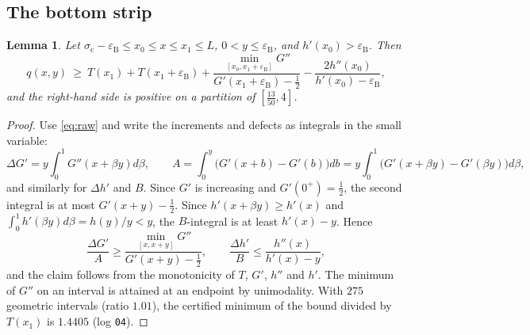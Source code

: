 \documentclass[11pt,a4paper]{article}
\newtheorem{lemma}[theorem]{Lemma}
\theoremstyle{definition}
\theoremstyle{remark}
\newcommand{\sig}{\sigma_{\mathrm c}}
\newcommand{\eB}{\varepsilon_{\mathrm B}}
\newcommand{\Lx}{L}
\begin{document}
\subsection{The bottom strip}
\begin{lemma}\label{lem:bottom}
Let $\sig-\eB\le x_0\le x\le x_1\le\Lx$, $0<y\le\eB$, and $h'(x_0)>\eB$. Then
\[
q(x,y)\ \ge\ T(x_1)+T(x_1+\eB)+\frac{\min_{[x_0,x_1+\eB]}G''}{G'(x_1+\eB)-\frac12}-\frac{2h''(x_0)}{h'(x_0)-\eB},
\]
and the right-hand side is positive on a partition of $[\frac{13}{50},4]$.
\end{lemma}
\begin{proof}
Use \eqref{eq:raw} and write the increments and defects as integrals in the small variable:
\[
\Delta G'=y\!\int_0^1\!G''(x+\beta y)d\beta,\qquad A=\int_0^y\bigl(G'(x+b)-G'(b)\bigr)db=y\!\int_0^1\!\bigl(G'(x+\beta y)-G'(\beta y)\bigr)d\beta,
\]
and similarly for $\Delta h'$ and $B$. Since $G'$ is increasing and $G'(0^+)=\frac12$, the second integral is at most $G'(x+y)-\frac12$. Since $h'(x+\beta y)\ge h'(x)$ and $\int_0^1h'(\beta y)d\beta=h(y)/y<y$, the $B$-integral is at least $h'(x)-y$. Hence
\[
\frac{\Delta G'}{A}\ge\frac{\min_{[x,x+y]}G''}{G'(x+y)-\frac12},\qquad \frac{\Delta h'}{B}\le\frac{h''(x)}{h'(x)-y},
\]
and the claim follows from the monotonicity of $T$, $G'$, $h''$ and $h'$. The minimum of $G''$ on an interval is attained at an endpoint by unimodality. With $275$ geometric intervals (ratio $1.01$), the certified minimum of the bound divided by $T(x_1)$ is $1.4405$ (log \texttt{04}).
\end{proof}
\end{document}

